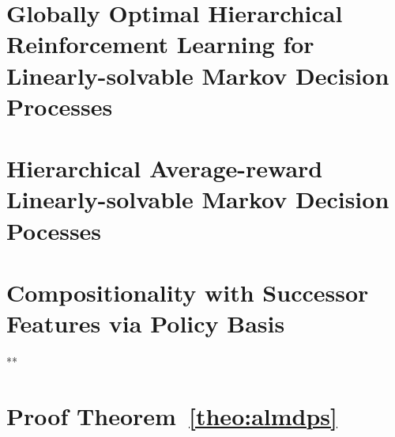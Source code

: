 \documentclass[12pt, a4paper,twoside]{tesi_upf}
\begin{document}
\chapter{Globally Optimal Hierarchical Reinforcement Learning for Linearly-solvable Markov Decision Processes}

\chapter{Hierarchical Average-reward Linearly-solvable Markov Decision Pocesses}

\chapter{Compositionality with Successor Features via Policy Basis}

% 




**\appendix
\chapter{Proof Theorem~\ref{theo:almdps}}


\backmatter 
\printindex
% 

\end{document}
